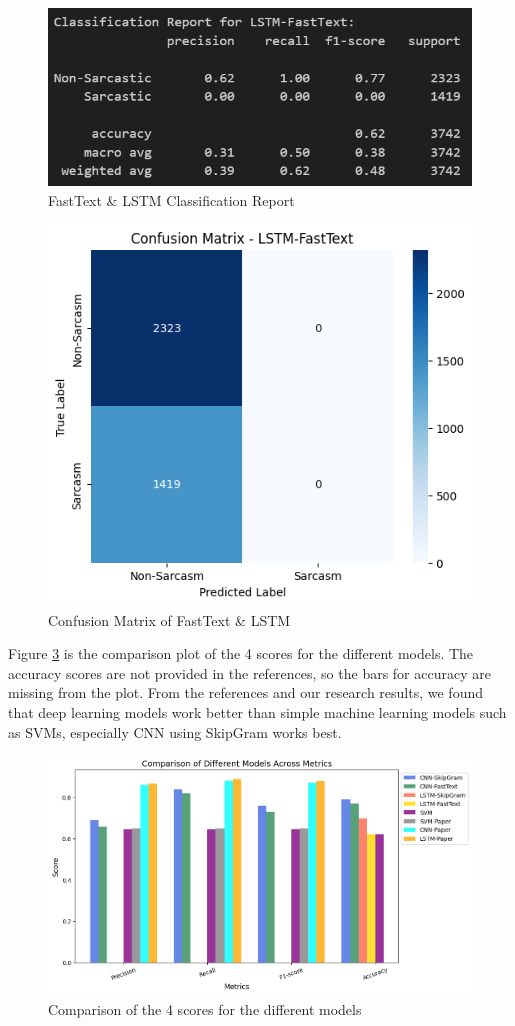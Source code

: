 \documentclass[11pt]{article}
\begin{document}
\begin{figure}[htbp]
    \centering
    \includegraphics[width=.8\linewidth]{pic/LSTM-Fasttext-Report.png}
    \caption{FastText \& LSTM Classification Report}
    \label{fig:ftlstmcr}
\end{figure}
\begin{figure}[htbp]
    \centering
    \includegraphics[width=.8\linewidth]{pic/LSTM-Fasttext-Matrix.png}
    \caption{Confusion Matrix of FastText \& LSTM}
    \label{fig:ftlstmcm}
\end{figure}

Figure \ref{fig:comp} is the comparison plot of the 4 scores for the different models. The accuracy scores are not provided in the references, so the bars for accuracy are missing from the plot. From the references and our research results, we found that deep learning models work better than simple machine learning models such as SVMs, especially CNN using SkipGram works best.
\begin{figure}[htbp]
    \centering
    \includegraphics[width=\linewidth]{pic/Comparison.png}
    \caption{Comparison of the 4 scores for the different models}
    \label{fig:comp}
\end{figure}
\end{document}

